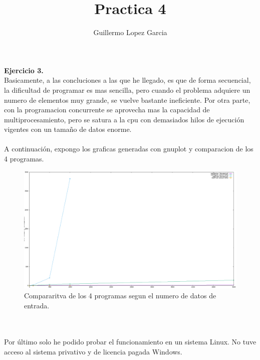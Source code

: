 \documentclass{minimal}
\title{Practica 4}
\author{Guillermo Lopez Garcia}
\begin{document}
\maketitle

\textbf{Ejercicio 3.} \\

Basicamente, a las concluciones a las que he llegado, es que de forma secuencial, la dificultad de programar es mas sencilla, pero cuando el problema adquiere un numero de elementos muy grande, se vuelve bastante ineficiente. Por otra parte, con la programacion concurrente se aprovecha mas la capacidad de multiprocesamiento, pero se satura a la cpu con demasiados hilos de ejecución vigentes con un tamaño de datos enorme.
\\
\\
A continuación, expongo los graficas generadas con gnuplot y comparacion de los 4 programas.
\\
\begin{figure}
  \includegraphics[width=\linewidth]{img.png}
  \caption{Compararitva de los 4 programas segun el numero de datos de entrada.}
\label{fig:comp}
\end{figure}
\\
\\
Por último solo he podido probar el funcionamiento en un sistema Linux. No tuve acceso al sistema privativo y de licencia pagada Windows.
\end{document}
